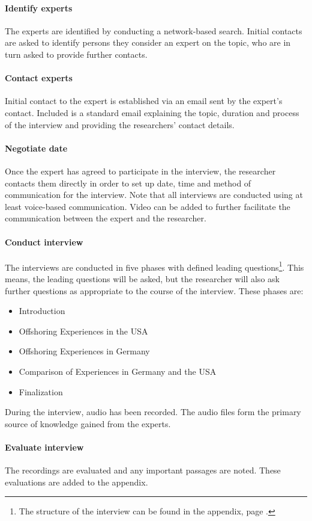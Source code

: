 \newpage

\paragraph{Identify experts} The experts are identified by conducting a network-based search. Initial contacts are asked to identify persons they consider an expert on the topic, who are in turn asked to provide further contacts.
\paragraph{Contact experts} Initial contact to the expert is established via an email sent by the expert's contact. Included is a standard email explaining the topic, duration and process of the interview and providing the researchers' contact details.
\paragraph{Negotiate date} Once the expert has agreed to participate in the interview, the researcher contacts them directly in order to set up date, time and method of communication for the interview. Note that all interviews are conducted using at least voice-based communication. Video can be added to further facilitate the communication between the expert and the researcher.
\paragraph{Conduct interview} The interviews are conducted in five phases with defined leading questions\footnote{The structure of the interview can be found in the appendix, page \pageref{app:InterviewStructure}.}. This means, the leading questions will be asked, but the researcher will also ask further questions as appropriate to the course of the interview. These phases are:
\begin{itemize}
	\item Introduction
	\item Offshoring Experiences in the USA
	\item Offshoring Experiences in Germany
	\item Comparison of Experiences in Germany and the USA
	\item Finalization
\end{itemize}
During the interview, audio has been recorded. The audio files form the primary source of knowledge gained from the experts.


\paragraph{Evaluate interview} The recordings are evaluated and any important passages are noted. These evaluations are added to the appendix.

